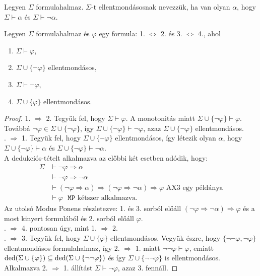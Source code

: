 \begin{defi}
Legyen $\Sigma$ formulahalmaz. $\Sigma$-t ellentmondásosnak nevezzük, ha van olyan $\alpha$, hogy $\Sigma \vdash \alpha$ és $\Sigma \vdash \lnot \alpha$.
\end{defi}
\begin{lem} Legyen $\Sigma$ formulahalmaz és $\varphi$ egy formula: 1. $\Leftrightarrow$ 2. és 3. $\Leftrightarrow$ 4., ahol
\begin{enumerate}
\item $\Sigma \vdash \varphi$,
\item $\Sigma \cup \lbrace \lnot \varphi \rbrace$ ellentmondásos,
\item $\Sigma \vdash \lnot \varphi$,
\item $\Sigma \cup \lbrace \varphi \rbrace$ ellentmondásos.
\end{enumerate}
\end{lem}
\begin{proof}
1. $\Rightarrow$ 2. Tegyük fel, hogy $\Sigma \vdash \varphi$. A monotonitás miatt $\Sigma \cup \lbrace \lnot \varphi \rbrace \vdash \varphi$. Továbbá $\lnot \varphi \in \Sigma \cup \lbrace \lnot \varphi \rbrace$, így $\Sigma \cup \lbrace \lnot \varphi \rbrace \vdash \lnot \varphi$, azaz $\Sigma \cup \lbrace \lnot \varphi \rbrace$ ellentmondásos. \\
. $\Rightarrow$ 1. Tegyük fel, hogy $\Sigma \cup \lbrace \lnot \varphi \rbrace$ ellentmondásos, így létezik olyan $\alpha$, hogy $\Sigma \cup \lbrace \lnot \varphi \rbrace \vdash \alpha$ és $\Sigma \cup \lbrace \lnot \varphi \rbrace \vdash \lnot \alpha$. \\
\indent A dedukciós-tételt alkalmazva az előbbi két esetben adódik, hogy: 
\begin{equation*}
\begin{split}
\Sigma &\vdash \lnot \varphi \Rightarrow \alpha \\
&\vdash \lnot \varphi \Rightarrow \lnot \alpha \\
& \vdash (\lnot \varphi \Rightarrow \alpha) \Rightarrow (\lnot \varphi \Rightarrow \lnot \alpha) \Rightarrow \varphi \text{ AX3 egy példánya} \\
& \vdash \varphi \text{ $\texttt{MP}$ kétszer alkalmazva.}
\end{split}
\end{equation*}
Az utolsó Modus Ponens részletezve: 1. és 3. sorból előáll $(\lnot \varphi \Rightarrow \lnot \alpha) \Rightarrow \varphi$ és a most kinyert formulából és 2. sorból előáll $\varphi$. \\
. $\Rightarrow$ 4. pontosan úgy, mint 1. $\Rightarrow$ 2. \\
. $\Rightarrow$ 3. Tegyük fel, hogy $\Sigma \cup \lbrace \varphi \rbrace$ ellentmondásos. Vegyük észre, hogy $\lbrace \lnot \lnot \varphi, \lnot \varphi \rbrace$ ellentmondásos formulahalmaz, így 2. $\Rightarrow$ 1. miatt $\lnot \lnot \varphi \vdash \varphi$, emiatt $\mathop{\mathrm{ded}}(\Sigma \cup \lbrace \varphi \rbrace) \subseteq \mathop{\mathrm{ded}}(\Sigma \cup \lbrace \lnot \lnot \varphi \rbrace)$ és így $\Sigma \cup \lbrace \lnot \lnot \varphi \rbrace$ is ellentmondásos. Alkalmazva 2. $\Rightarrow$ 1. állítást $\Sigma \vdash \lnot \varphi$, azaz 3. fennáll.
\end{proof}
